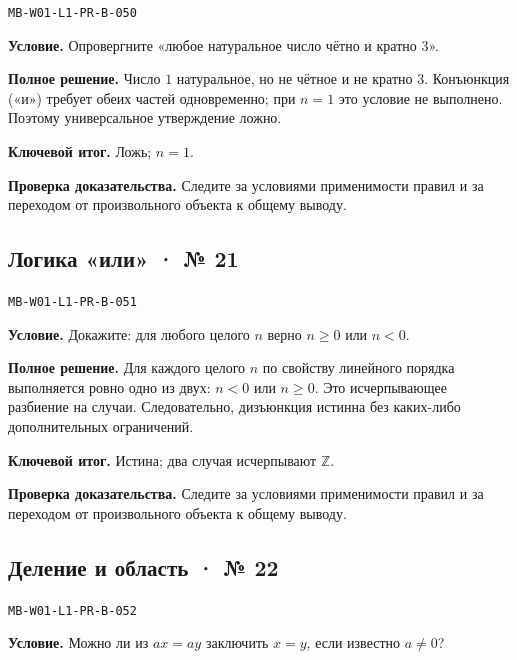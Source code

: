 \documentclass[11pt,a4paper,openany]{book}
\newcommand{\muid}[1]{\texttt{\footnotesize #1}}
\begin{document}
\muid{MB-W01-L1-PR-B-050}\par

\textbf{Условие.} Опровергните «любое натуральное число чётно и кратно $3$».\par

\textbf{Полное решение.} Число $1$ натуральное, но не чётное и не кратно $3$. Конъюнкция («и») требует обеих частей одновременно; при $n=1$ это условие не выполнено. Поэтому универсальное утверждение ложно.


\begin{learnbox}\textbf{Ключевой итог.} Ложь; $n=1$.\par \textbf{Проверка доказательства.} 
Следите за условиями применимости правил и за переходом от произвольного объекта к общему выводу. 
\end{learnbox}

\subsection*{Логика «или» · № 21}\hypertarget{solution:MB-W01-L1-PR-B-051}{}

\muid{MB-W01-L1-PR-B-051}\par

\textbf{Условие.} Докажите: для любого целого $n$ верно $n\ge0$ или $n<0$.\par

\textbf{Полное решение.} Для каждого целого $n$ по свойству линейного порядка выполняется ровно одно из двух: $n<0$ или $n\ge0$. Это исчерпывающее разбиение на случаи. Следовательно, дизъюнкция истинна без каких-либо дополнительных ограничений.


\begin{learnbox}\textbf{Ключевой итог.} Истина; два случая исчерпывают $\mathbb Z$.\par \textbf{Проверка доказательства.} 
Следите за условиями применимости правил и за переходом от произвольного объекта к общему выводу. 
\end{learnbox}

\subsection*{Деление и область · № 22}\hypertarget{solution:MB-W01-L1-PR-B-052}{}

\muid{MB-W01-L1-PR-B-052}\par

\textbf{Условие.} Можно ли из $ax=ay$ заключить $x=y$, если известно $a\ne0$?\par
\end{document}
